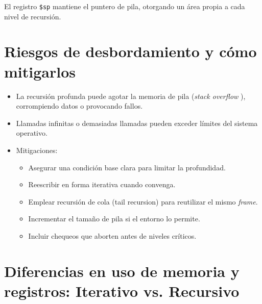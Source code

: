 \documentclass{article}
\begin{document}
El registro \texttt{\$sp} mantiene el puntero de pila, otorgando un área propia a cada nivel de recursión.



\section{Riesgos de desbordamiento y cómo mitigarlos}


\begin{itemize}
  \item La recursión profunda puede agotar la memoria de pila (\emph{stack overflow }), corrompiendo datos o provocando fallos.
  \item Llamadas infinitas o demasiadas llamadas pueden exceder límites del sistema operativo.
  \item Mitigaciones:
    \begin{itemize}
      \item Asegurar una condición base clara para limitar la profundidad.
      \item Reescribir en forma iterativa cuando convenga.
      \item Emplear recursión de cola (tail recursion) para reutilizar el mismo \emph{frame}.
      \item Incrementar el tamaño de pila si el entorno lo permite.
      \item Incluir chequeos que aborten antes de niveles críticos.
    \end{itemize}
\end{itemize}

\section{Diferencias en uso de memoria y registros: Iterativo vs. Recursivo}
\end{document}
